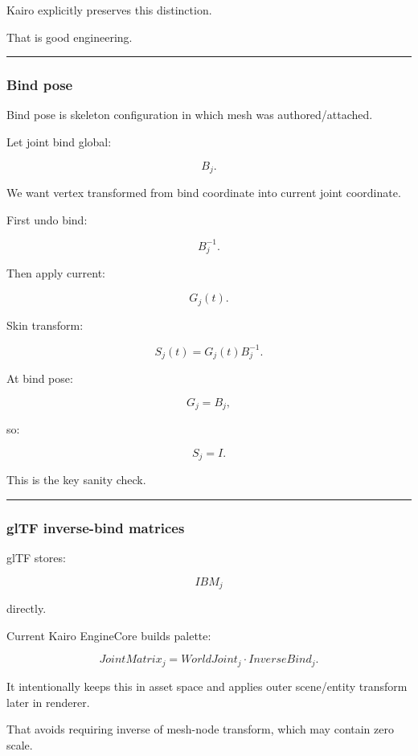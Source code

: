 Kairo explicitly preserves this distinction.

That is good engineering.

\begin{center}\rule{0.5\linewidth}{0.5pt}\end{center}

\subsubsection{Bind pose}\label{bind-pose}

Bind pose is skeleton configuration in which mesh was authored/attached.

Let joint bind global:

\[
B_j.
\]

We want vertex transformed from bind coordinate into current joint coordinate.

First undo bind:

\[
B_j^{-1}.
\]

Then apply current:

\[
G_j(t).
\]

Skin transform:

\[
\boxed{
S_j(t)
=
G_j(t)
B_j^{-1}.
}
\]

At bind pose:

\[
G_j=B_j,
\]

so:

\[
S_j=
I.
\]

This is the key sanity check.

\begin{center}\rule{0.5\linewidth}{0.5pt}\end{center}

\subsubsection{glTF inverse-bind matrices}\label{gltf-inverse-bind-matrices}

glTF stores:

\[
IBM_j
\]

directly.

Current Kairo EngineCore builds palette:

\[
\boxed{
JointMatrix_j
=
WorldJoint_j
\cdot
InverseBind_j.
}
\]

It intentionally keeps this in asset space and applies outer scene/entity transform later in renderer.

That avoids requiring inverse of mesh-node transform, which may contain zero scale.

